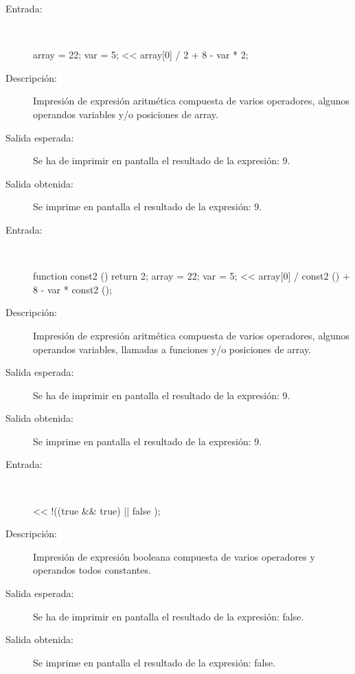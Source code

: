 	\begin{description}
		\item [Entrada:] \hfill \\
\begin{myverbatim}
   array = {22};
   var = 5;
   << array[0] / 2 + 8 - var * 2;
\end{myverbatim}
		\item [Descripción:] Impresión de expresión aritmética compuesta de varios operadores, algunos operandos variables y/o posiciones de array.
		\item [Salida esperada:] Se ha de imprimir en pantalla el resultado de la expresión: 9.
		\item [Salida obtenida:] Se imprime en pantalla el resultado de la expresión: 9.
	\end{description}

	\begin{description}
		\item [Entrada:] \hfill \\
\begin{myverbatim}
   function const2 () {
      return 2;
   }
   array = {22};
   var = 5;
   << array[0] / const2 () + 8 - var * const2 ();
\end{myverbatim}
		\item [Descripción:] Impresión de expresión aritmética compuesta de varios operadores, algunos operandos variables, llamadas a funciones y/o posiciones de array.
		\item [Salida esperada:] Se ha de imprimir en pantalla el resultado de la expresión: 9.
		\item [Salida obtenida:] Se imprime en pantalla el resultado de la expresión: 9.
	\end{description}

	\begin{description}
		\item [Entrada:] \hfill \\
\begin{myverbatim}
   << !((true && true) || false );
\end{myverbatim}
		\item [Descripción:] Impresión de expresión booleana compuesta de varios operadores y operandos todos constantes.
		\item [Salida esperada:] Se ha de imprimir en pantalla el resultado de la expresión: false.
		\item [Salida obtenida:] Se imprime en pantalla el resultado de la expresión: false.
	\end{description}

